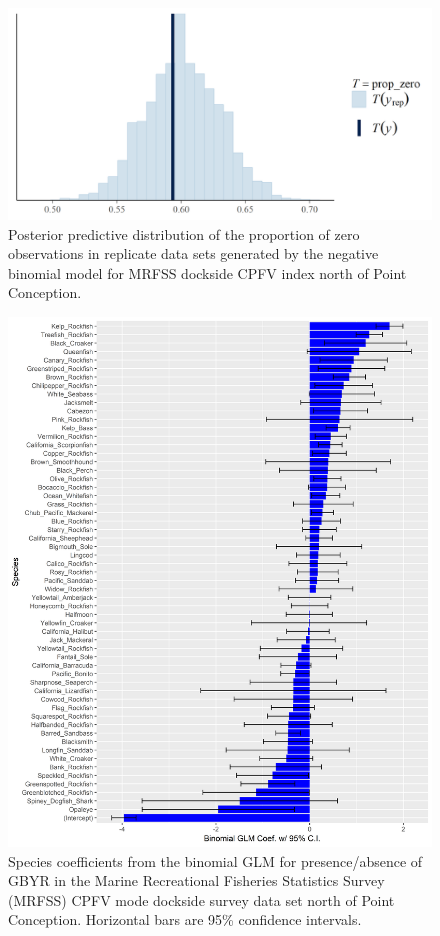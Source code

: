 \documentclass[12pt,]{article}
\begin{document}
\begin{figure}
\centering
\includegraphics{Figures/Fleet10_prop_zero_STAN.png}
\caption{Posterior predictive distribution of the proportion of zero
observations in replicate data sets generated by the negative binomial
model for MRFSS dockside CPFV index north of Point Conception.
\label{fig:Fleet10_prop_zero_STAN}}
\end{figure}

\FloatBarrier

\begin{figure}
\centering
\includegraphics{Figures/Fleet11_SM_filter.png}
\caption{Species coefficients from the binomial GLM for presence/absence
of GBYR in the Marine Recreational Fisheries Statistics Survey (MRFSS)
CPFV mode dockside survey data set north of Point Conception. Horizontal
bars are 95\% confidence intervals. \label{fig:Fleet11_SM_filter}}
\end{figure}
\end{document}
